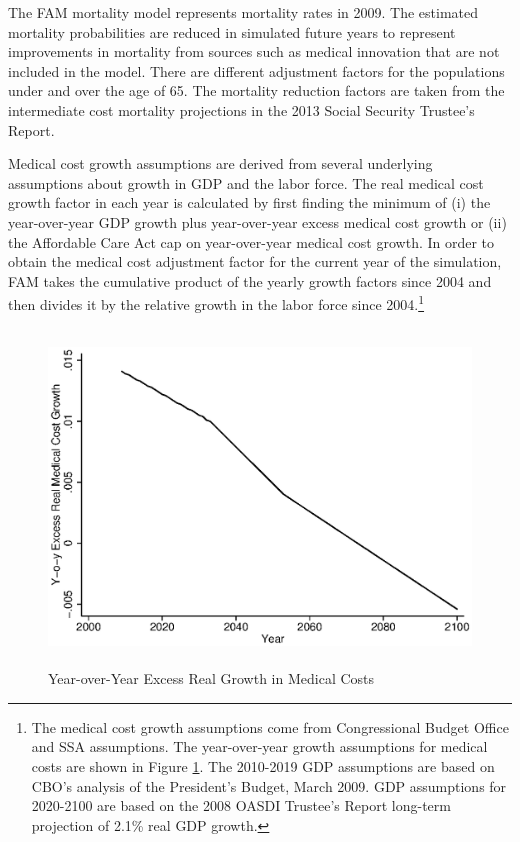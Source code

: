 \noindent The FAM mortality model represents mortality rates in 2009. The estimated mortality probabilities are reduced in simulated future years to represent improvements in mortality from sources such as medical innovation that are not included in the model. There are different adjustment factors for the populations under and over the age of 65. The mortality reduction factors are taken from the intermediate cost mortality projections in the 2013 Social Security Trustee's Report.

\noindent Medical cost growth assumptions are derived from several underlying assumptions about growth in GDP and the labor force. The real medical cost growth factor in each year is calculated by first finding the minimum of (i) the year-over-year GDP growth plus year-over-year excess medical cost growth or (ii) the Affordable Care Act cap on year-over-year medical cost growth. In order to obtain the medical cost adjustment factor for the current year of the simulation, FAM takes the cumulative product of the yearly growth factors since 2004 and then divides it by the relative growth in the labor force since 2004.\footnote{The medical cost growth assumptions come from Congressional Budget Office and SSA assumptions.
The year-over-year growth assumptions for medical costs are shown in Figure \ref{figure:medgrowth_yearly}.
The 2010-2019 GDP assumptions are based on CBO's analysis of the President's Budget, March 2009.
GDP assumptions for 2020-2100 are based on the 2008 OASDI Trustee's Report long-term projection of 2.1\% real GDP growth.}

\begin{figure}
\caption{Year-over-Year Excess Real Growth in Medical Costs} \label{figure:medgrowth_yearly}
 \centering
	 \includegraphics[height=3.5in]{AppOutput/Health/medgrowth_yearly}
\end{figure}

